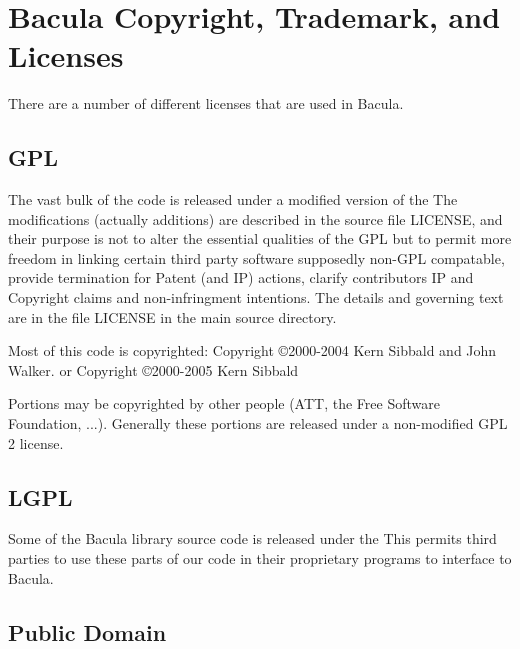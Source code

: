 
\section*{Bacula Copyright, Trademark, and Licenses}
\label{_ChapterStart29}

There are a number of different licenses that are used in Bacula. 

\subsection*{GPL}

The vast bulk of the code is released under a modified version of the 
 The
modifications (actually additions) are described in the source file LICENSE,
and their purpose is not to alter the essential qualities of the GPL but to
permit more freedom in linking certain third party software supposedly non-GPL
compatable, provide termination for Patent (and IP) actions, clarify
contributors IP and Copyright claims and non-infringment intentions. The
details and governing text are in the file LICENSE in the main source
directory. 

Most of this code is copyrighted: Copyright \copyright 2000-2004 Kern Sibbald and
John Walker. or Copyright \copyright 2000-2005 Kern Sibbald 

Portions may be copyrighted by other people (ATT, the Free Software
Foundation, ...). Generally these portions are released under a
non-modified GPL 2 license.

\subsection*{LGPL}

Some of the Bacula library source code is released under the 
 This
permits third parties to use these parts of our code in their proprietary
programs to interface to Bacula. 

\subsection*{Public Domain}

